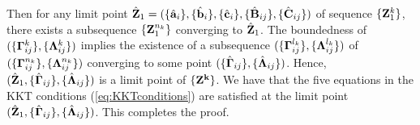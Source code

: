 \documentclass[journal]{IEEEtran}
\newcommand{\B}{{\bf B}}
\newcommand{\C}{{\bf C}}
\newcommand{\rev}[1]{{\color{black} #1}} %
\newcommand{\bB}{{\bf B}}
\newcommand{\bC}{{\bf C}}
\newcommand{\bZ}{{\bf Z}}
\begin{document}
\rev{Then for any limit point $\hat{\bZ}_1 = (\{\hat{{\bf a}}_i\}, \{\hat{{\bf b}}_i\}, \{\hat{{\bf c}}_i\}, \{\hat{\B}_{ij}\}, \{\hat{\C}_{ij}\})$ of sequence $\{{\bZ}_1^k\}$, there exists a subsequence $\{{\bZ}_1^{n_k}\}$ converging to $\hat{\bZ}_1$. The boundedness of $(\{{\bf{\Gamma}}_{ij}^k\},\{{\bf{\Lambda}}_{ij}^k\})$ implies the existence of a subsequence $(\{{\bf{\Gamma}}_{ij}^{l_k}\},\{{\bf{\Lambda}}_{ij}^{l_k}\})$ of $(\{{\bf{\Gamma}}_{ij}^{n_k}\},\{{\bf{\Lambda}}_{ij}^{n_k}\})$ converging to some point $(\{\hat{{\bf{\Gamma}}}_{ij}\},\{\hat{{\bf{\Lambda}}}_{ij}\})$. Hence, $(\hat{\bZ}_1,\{\hat{{\bf{\Gamma}}}_{ij}\},\{\hat{{\bf{\Lambda}}}_{ij}\})$ is a limit point of $\{\bf{Z}^k\}$. We have that the  five equations in the KKT conditions (\ref{eq:KKTconditions}) are satisfied at the limit point $(\hat{\bZ}_1,\{\hat{{\bf{\Gamma}}}_{ij}\},\{\hat{{\bf{\Lambda}}}_{ij}\})$. This completes the proof.
}
\end{document}
